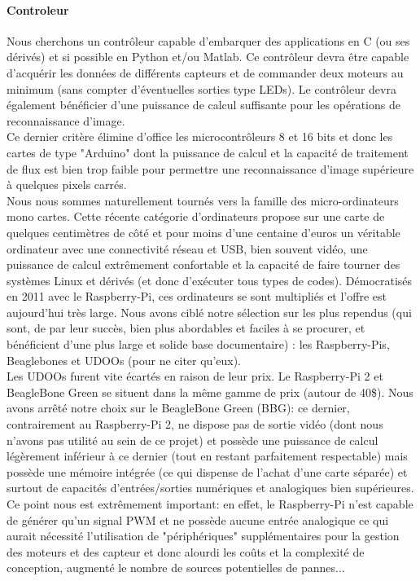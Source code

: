 		\paragraph{Controleur}\label{Solution-controleur}

			Nous cherchons un contrôleur capable d'embarquer des applications en C (ou ses dérivés) et si possible en Python et/ou Matlab.
			Ce contrôleur devra être capable d'acquérir les données de différents capteurs et de commander deux moteurs au minimum (sans compter d'éventuelles sorties type LEDs).
			Le contrôleur devra également bénéficier d'une puissance de calcul suffisante pour les opérations de reconnaissance d'image.\\

			Ce dernier critère élimine d'office les microcontrôleurs 8 et 16 bits et donc les cartes de type "Arduino" dont la puissance de calcul et la capacité de traitement de flux est bien trop faible pour permettre une reconnaissance d'image supérieure à quelques pixels carrés.\\

			Nous nous sommes naturellement tournés vers la famille des micro-ordinateurs mono cartes. Cette récente catégorie d'ordinateurs propose sur une carte de quelques centimètres de côté et pour moins d'une centaine d'euros un véritable ordinateur avec une connectivité réseau et USB, bien souvent vidéo, une puissance de calcul extrêmement confortable et la capacité de faire tourner des systèmes Linux et dérivés (et donc d’exécuter tous types de codes). Démocratisés en 2011 avec le Raspberry-Pi, ces ordinateurs se sont multipliés et l'offre est aujourd'hui très large. Nous avons ciblé notre sélection sur les plus rependus (qui sont, de par leur succès, bien plus abordables et faciles à se procurer, et bénéficient d'une plus large et solide base documentaire) : les Raspberry-Pis, Beaglebones et UDOOs (pour ne citer qu'eux).\\

			Les UDOOs furent vite écartés en raison de leur prix.
			Le Raspberry-Pi 2 et BeagleBone Green se situent dans la même gamme de prix (autour de 40\$). Nous avons arrêté notre choix sur le BeagleBone Green (BBG): ce dernier, contrairement au Raspberry-Pi 2, ne dispose pas de sortie vidéo (dont nous n'avons pas utilité au sein de ce projet) et possède une puissance de calcul légèrement inférieur à ce dernier (tout en restant parfaitement respectable) mais possède une mémoire intégrée (ce qui dispense de l'achat d'une carte séparée) et surtout de capacités d'entrées/sorties numériques et analogiques bien supérieures. Ce point nous est extrêmement important: en effet, le Raspberry-Pi n'est capable de générer qu'un signal PWM et ne possède aucune entrée analogique ce qui aurait nécessité l'utilisation de "périphériques" supplémentaires pour la gestion des moteurs et des capteur et donc alourdi les coûts et la complexité de conception, augmenté le nombre de sources potentielles de pannes...\\

